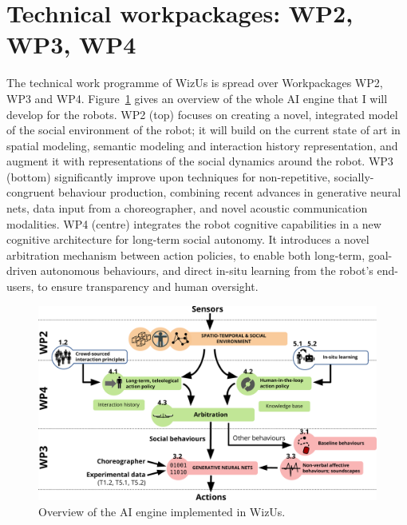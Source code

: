\documentclass[11pt,a4paper]{report}
\newcommand{\project}{WizUs\xspace}
\begin{document}

\section{Technical workpackages: WP2, WP3, WP4}

The technical work programme of \project is spread over Workpackages WP2, WP3
and WP4. Figure~\ref{fig:archi} gives an overview of the whole AI engine
that I will develop for the robots. WP2 (top) focuses on creating a novel,
integrated model of the social environment of the robot; it will build on the
current state of art in spatial modeling, semantic modeling and interaction
history representation, and augment it with representations of the social
dynamics around the robot. WP3 (bottom) significantly improve upon techniques
for non-repetitive, socially-congruent behaviour production, combining recent
advances in generative neural nets, data input from a choreographer, and novel
acoustic communication modalities. WP4 (centre) integrates the robot cognitive
capabilities in a new cognitive architecture for long-term social autonomy. It
introduces a novel arbitration mechanism between action policies, to enable both
long-term, goal-driven autonomous behaviours, and direct in-situ learning from
the robot's end-users, to ensure transparency and human oversight.

\begin{figure}[h!]
\centering
\includegraphics[width=\linewidth]{figs/archi}
\caption{Overview of the AI engine implemented in \project.}
\label{fig:archi}
\end{figure}
\end{document}
